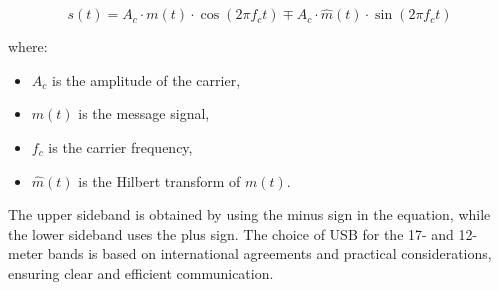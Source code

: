 \[
s(t) = A_c \cdot m(t) \cdot \cos(2\pi f_c t) \mp A_c \cdot \hat{m}(t) \cdot \sin(2\pi f_c t)
\]

where:
\begin{itemize}
    \item \( A_c \) is the amplitude of the carrier,
    \item \( m(t) \) is the message signal,
    \item \( f_c \) is the carrier frequency,
    \item \( \hat{m}(t) \) is the Hilbert transform of \( m(t) \).
\end{itemize}

The upper sideband is obtained by using the minus sign in the equation, while the lower sideband uses the plus sign. The choice of USB for the 17- and 12-meter bands is based on international agreements and practical considerations, ensuring clear and efficient communication.

